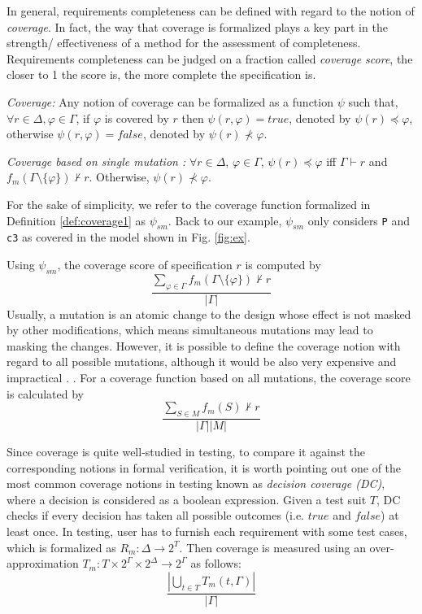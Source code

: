 In general, requirements completeness can be defined with regard to the notion of \emph{coverage}. In fact, the way that coverage is formalized plays a key part in the strength/ effectiveness of a method for the assessment of completeness. Requirements completeness can be judged on a fraction called \emph{coverage score}, the closer to 1 the score is, the more complete the specification is.

\begin{definition}{\emph{Coverage:}}
  \label{def:coverage}
   Any notion of coverage can be formalized as a function $\psi$ such that,
   $\forall r \in \Delta, \varphi \in \Gamma$, if $\varphi$ is covered by $r$ then $\psi (r, \varphi) = true$, denoted by $\psi (r) \preccurlyeq \varphi$, otherwise  $\psi (r, \varphi) = false$, denoted by $\psi (r) \nprec \varphi$.
\end{definition}

\begin{definition} {\emph{Coverage based on single mutation \cite{chockler2010coverage, chockler_coverage_2003}:}}
  \label{def:coverage1}
   $\forall r \in \Delta$,
   $\varphi \in \Gamma$,
   $\psi (r) \preccurlyeq \varphi$
   iff $\Gamma \vdash r$ and
   $f_m (\Gamma \setminus \{ \varphi \}) \nvdash r$. Otherwise, $\psi (r) \nprec \varphi$.
\end{definition}

For the sake of simplicity, we refer to the coverage function
formalized in Definition \ref{def:coverage1} as $\psi_{sm}$. 
Back to our example, $\psi_{sm}$ only considers {\tt P} and {\tt c3} as covered in the model shown in Fig. \ref{fig:ex}.

Using $\psi_{sm}$, the coverage score of specification $r$ is computed by $$\frac{\sum_{\varphi \in \Gamma} f_m (\Gamma \setminus \{ \varphi \}) \nvdash r}{|\Gamma|}$$
Usually, a mutation is an atomic change to the design whose effect is not masked by other modifications, which means simultaneous mutations may lead to masking the changes. However,
it is possible to define the coverage notion with regard to all possible mutations, although it would be also very expensive and impractical \cite{chockler2001practical}. .
For a coverage function based on all mutations, the coverage score is calculated by
$$ \frac{\sum_{S \in M} f_m (S) \nvdash r}{|\Gamma| |M|}$$

Since coverage is quite well-studied in testing, to compare it against the corresponding notions in formal verification, it is worth pointing out one of the most common coverage notions in testing known as \emph{decision coverage (DC)}, where a decision is considered as a boolean expression.  Given a test suit $T$, DC checks if every decision has taken all possible outcomes (i.e. $true$ and $false$) at least once. In testing, user has to furnish each requirement with some test cases, which is formalized as $R_m : \Delta \rightarrow 2^T$. Then coverage is measured using an over-approximation $T_m : T \times 2^\Gamma \times 2^\Delta \rightarrow 2^\Gamma$ as follows: $$\frac{|\bigcup_{t \in T} T_m (t, \Gamma)|}{|\Gamma|}$$ 

